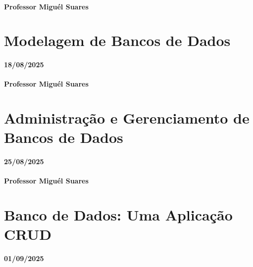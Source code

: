 \documentclass[
]{book}
\begin{document}
\subsubsection*{Professor Miguél Suares}\label{professor-miguuxe9l-suares-1}

\chapter{Modelagem de Bancos de Dados}\label{modelagem-de-bancos-de-dados}

\subsubsection*{18/08/2025}\label{section-2}

\subsubsection*{Professor Miguél Suares}\label{professor-miguuxe9l-suares-2}

\chapter{Administração e Gerenciamento de Bancos de Dados}\label{administrauxe7uxe3o-e-gerenciamento-de-bancos-de-dados}

\subsubsection*{25/08/2025}\label{section-3}

\subsubsection*{Professor Miguél Suares}\label{professor-miguuxe9l-suares-3}

\chapter{Banco de Dados: Uma Aplicação CRUD}\label{banco-de-dados-uma-aplicauxe7uxe3o-crud}

\subsubsection*{01/09/2025}\label{section-4}
\end{document}
